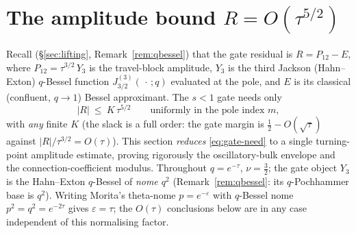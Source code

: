 %
\providecommand{\proved}{\textsc{[proved]}}
\providecommand{\cited}{\textsc{[cited]}}
\providecommand{\checked}{\textsc{[checked]}}
\section{The amplitude bound \texorpdfstring{$R=O(\tau^{5/2})$}{R=O(tau^5/2)}}
\label{sec:amplitude}

Recall (\S\ref{sec:lifting}, Remark~\ref{rem:qbessel}) that the gate residual is $R=P_{12}-E$, where
$P_{12}=\tau^{3/2}\,Y_3$ is the travel-block amplitude, $Y_3$ is the third Jackson
(Hahn--Exton) $q$-Bessel function $J^{(3)}_{3/2}(\,\cdot\,;q)$ evaluated at the pole, and
$E$ is its classical (confluent, $q\to1$) Bessel approximant. The $s<1$ gate needs only
\begin{equation}\label{eq:gate-need}
   |R|\ \le\ K\,\tau^{5/2}\qquad\text{uniformly in the pole index }m,
\end{equation}
with \emph{any} finite $K$ (the slack is a full order: the gate margin is
$\tfrac12-O(\sqrt\tau)$ against $|R|/\tau^{3/2}=O(\tau)$). This section \emph{reduces}
\eqref{eq:gate-need} to a single turning-point amplitude estimate, proving rigorously the
oscillatory-bulk envelope and the connection-coefficient modulus. Throughout $q=e^{-\tau}$,
$\nu=\tfrac32$; the gate object $Y_3$ is the Hahn--Exton $q$-Bessel of \emph{nome $q^2$}
(Remark~\ref{rem:qbessel}: its $q$-Pochhammer base is $q^2$). Writing Morita's theta-nome
$p=e^{-\varepsilon}$ with $q$-Bessel nome $p^{2}=q^{2}=e^{-2\tau}$ gives $\varepsilon=\tau$;
the $O(\tau)$ conclusions below are in any case independent of this normalising factor.

